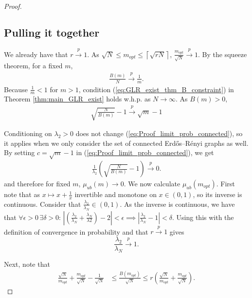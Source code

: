 \begin{proof}
\subsection{Pulling it together}
We already have that $r \overset{p}{\to} 1$. As $\sqrt{N} \leq m_{opt} \leq \left\lceil\sqrt{rN}\right\rceil$, $\frac{m_{opt}}{\sqrt{N}} \overset{p}{\to} 1$. By the squeeze theorem, for a fixed $m$,
\begin{align}
    \frac{B(m)}{N} \overset{p}{\to} \frac{1}{m}.
\end{align}
Because $\frac{1}{m} < 1$ for $m > 1$, condition (\ref{eq:GLR_exist_thm_B_constraint}) in Theorem \ref{thm:main_GLR_exist} holds w.h.p. as $N \to \infty$.
As $B(m) > 0$,
\begin{align}
    \sqrt{\frac{N}{B(m)}} - 1 \overset{p}{\to} \sqrt{m} - 1
\end{align}

Conditioning on $\lambda_{2} > 0$ does not change (\ref{eq:Proof_limit_prob_connected}), so it applies when we only consider the set of connected Erdős–Rényi graphs as well. By setting $c = \sqrt{m} - 1$ in (\ref{eq:Proof_limit_prob_connected}), we get 
\begin{align}
    \frac{1}{\lambda_{2}} \left( \sqrt{\frac{N}{B(m)}}-1 \right) \overset{p}{\to} 0.
\end{align}
and therefore for fixed $m$, $\mu_{ub}(m) \to 0$. We now calculate $\mu_{ub}(m_{opt})$. First note that as $x \mapsto x + \frac{1}{x}$ invertible and monotone on $x \in (0,1)$, so its inverse is continuous. Consider that $\frac{\lambda_{2}}{\lambda_{N}} \in (0,1)$. As the inverse is continuous, we have that $\forall \epsilon > 0 \,\exists \delta > 0:\, \left\lvert\left( \frac{\lambda_{2}}{\lambda_{N}} + \frac{\lambda_{N}}{\lambda{2}}\right) - 2\right\rvert < \epsilon \implies \left\lvert\frac{\lambda_{2}}{\lambda_{N}} - 1\right\rvert < \delta$. Using this with the definition of convergence in probability and that $r \overset{p}{\to} 1$ gives
\begin{equation}
    \frac{\lambda_{2}}{\lambda_{N}} \overset{p}{\to} 1.
\end{equation}

Next, note that
\begin{align}
    \frac{\sqrt{N}}{m_{opt}} + \frac{m_{opt}}{\sqrt{N}} - \frac{1}{\sqrt{N}} &\leq \frac{B(m_{opt})}{\sqrt{N}} \leq r\left( \frac{\sqrt{N}}{m_{opt}} + \frac{m_{opt}}{\sqrt{N}} \right).
\end{align}


\end{proof}
